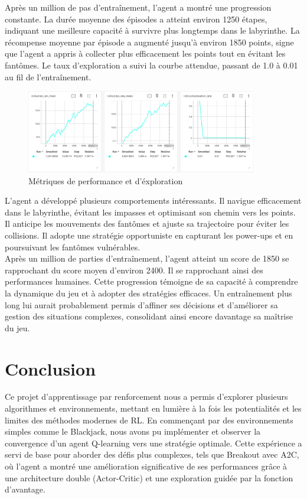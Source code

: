 \documentclass{article}
\begin{document}
Après un million de pas d’entraînement, l’agent a montré une progression constante. La durée moyenne des épisodes a atteint environ 1250 étapes, indiquant une meilleure capacité à survivre plus longtemps dans le labyrinthe. La récompense moyenne par épisode a augmenté jusqu’à environ 1850 points, signe que l’agent a appris à collecter plus efficacement les points tout en évitant les fantômes. Le taux d’exploration a suivi la courbe attendue, passant de 1.0 à 0.01 au fil de l’entraînement.\\

\begin{figure}[ht]
    \centering
    \includegraphics[width=0.9\textwidth]{13.png}
    \caption{Métriques de performance et d'éxploration}
\end{figure}

L’agent a développé plusieurs comportements intéressants. Il navigue efficacement dans le labyrinthe, évitant les impasses et optimisant son chemin vers les points. Il anticipe les mouvements des fantômes et ajuste sa trajectoire pour éviter les collisions. Il adopte une stratégie opportuniste en capturant les power-ups et en poursuivant les fantômes vulnérables.\\

Après un million de parties d’entraînement, l’agent atteint un score de 1850 se rapprochant du score moyen d’environ 2400. Il se rapprochant ainsi des performances humaines. Cette progression témoigne de sa capacité à comprendre la dynamique du jeu et à adopter des stratégies efficaces. Un entraînement plus long lui aurait probablement permis d’affiner ses décisions et d’améliorer sa gestion des situations complexes, consolidant ainsi encore davantage sa maîtrise du jeu.

\clearpage

\section{Conclusion}
\quad Ce projet d'apprentissage par renforcement nous a permis d'explorer plusieurs algorithmes et environnements, mettant en lumière à la fois les potentialités et les limites des méthodes modernes de RL. En commençant par des environnements simples comme le Blackjack, nous avons pu implémenter et observer la convergence d'un agent Q-learning vers une stratégie optimale. Cette expérience a servi de base pour aborder des défis plus complexes, tels que Breakout avec A2C, où l'agent a montré une amélioration significative de ses performances grâce à une architecture double (Actor-Critic) et une exploration guidée par la fonction d'avantage.\\
\end{document}
